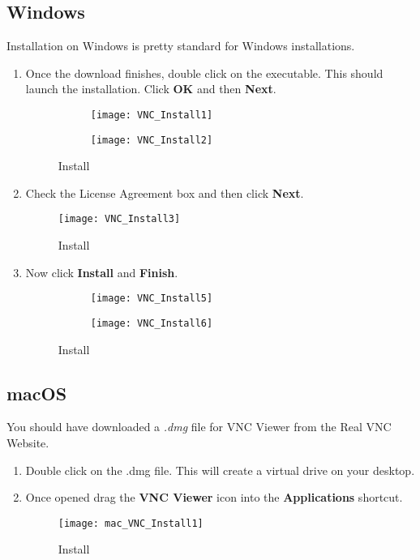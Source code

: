 \documentclass[
a4paper,
fontsize=14pt, %
pagesize, %
parskip=half-, %
]{scrartcl} %
\theoremstyle{mythmstyle} %
\begin{document}
\subsection{Windows}
Installation on Windows is pretty standard for Windows installations.
\begin{enumerate}
    \item Once the download finishes, double click on the executable.  This should launch the installation.  Click \textbf{OK} and then \textbf{Next}.
    \begin{figure}[h]
        \begin{subfigure}{.5\textwidth}
            \centering\texttt{[image: VNC\_Install1]} 
        \end{subfigure}
        \begin{subfigure}{.5\textwidth}
            \centering\texttt{[image: VNC\_Install2]}
        \end{subfigure}
        \caption{Install}
    \end{figure}
    \item Check the License Agreement box and then click \textbf{Next}.
    \begin{figure}[h]
        \centering\texttt{[image: VNC\_Install3]}
        \caption{Install}
    \end{figure}

\clearpage
    \item Now click \textbf{Install} and \textbf{Finish}.
    \begin{figure}[h]
        \begin{subfigure}{.5\textwidth}
            \centering\texttt{[image: VNC\_Install5]} 
        \end{subfigure}
        \begin{subfigure}{.5\textwidth}
            \centering\texttt{[image: VNC\_Install6]}
        \end{subfigure}
        \caption{Install}
    \end{figure}
\end{enumerate}
\subsection{macOS}
You should have downloaded a \emph{.dmg} file for VNC Viewer from the Real VNC Website.
\begin{enumerate}
    \item Double click on the .dmg file.  This will create a virtual drive on your desktop.
    \item Once opened drag the \textbf{VNC Viewer} icon into the \textbf{Applications} shortcut.
    \begin{figure}[h]
        \centering\texttt{[image: mac\_VNC\_Install1]}
        \caption{Install}
    \end{figure}
\end{enumerate}
\end{document}
